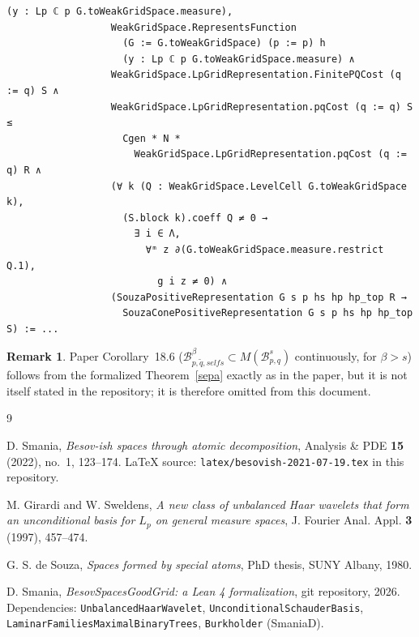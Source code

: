 \documentclass[11pt]{amsart}
\theoremstyle{definition}
\newtheorem{remark}[theorem]{Remark}
\begin{document}
\begin{lstlisting}[style=lean,basicstyle=\ttfamily\scriptsize]
                    (y : Lp ℂ p G.toWeakGridSpace.measure),
                  WeakGridSpace.RepresentsFunction
                    (G := G.toWeakGridSpace) (p := p) h
                    (y : Lp ℂ p G.toWeakGridSpace.measure) ∧
                  WeakGridSpace.LpGridRepresentation.FinitePQCost (q := q) S ∧
                  WeakGridSpace.LpGridRepresentation.pqCost (q := q) S ≤
                    Cgen * N *
                      WeakGridSpace.LpGridRepresentation.pqCost (q := q) R ∧
                  (∀ k (Q : WeakGridSpace.LevelCell G.toWeakGridSpace k),
                    (S.block k).coeff Q ≠ 0 →
                      ∃ i ∈ Λ,
                        ∀ᵐ z ∂(G.toWeakGridSpace.measure.restrict Q.1),
                          g i z ≠ 0) ∧
                  (SouzaPositiveRepresentation G s p hs hp hp_top R →
                    SouzaConePositiveRepresentation G s p hs hp hp_top S) := ...
\end{lstlisting}

\begin{remark}
Paper Corollary~18.6 ($\mathcal{B}^\beta_{p,\tilde{q},selfs} \subset
M(\mathcal{B}^s_{p,q})$ continuously, for $\beta>s$) follows from the
formalized Theorem~\ref{sepa} exactly as in the paper, but it is not itself
stated in the repository; it is therefore omitted from this document.
\end{remark}

\begin{thebibliography}{9}

 D. Smania,
\emph{Besov-ish spaces through atomic decomposition},
Analysis \& PDE \textbf{15} (2022), no.~1, 123--174.
LaTeX source: \texttt{latex/besovish-2021-07-19.tex} in this repository.

 M. Girardi and W. Sweldens,
\emph{A new class of unbalanced Haar wavelets that form an unconditional basis for $L_p$ on general measure spaces},
J. Fourier Anal. Appl. \textbf{3} (1997), 457--474.

 G. S. de Souza,
\emph{Spaces formed by special atoms},
PhD thesis, SUNY Albany, 1980.

 D. Smania,
\emph{BesovSpacesGoodGrid: a Lean 4 formalization},
git repository, 2026. Dependencies: \texttt{UnbalancedHaarWavelet},
\texttt{UnconditionalSchauderBasis}, \texttt{LaminarFamiliesMaximalBinaryTrees},
\texttt{Burkholder} (SmaniaD).

\end{thebibliography}
\end{document}
